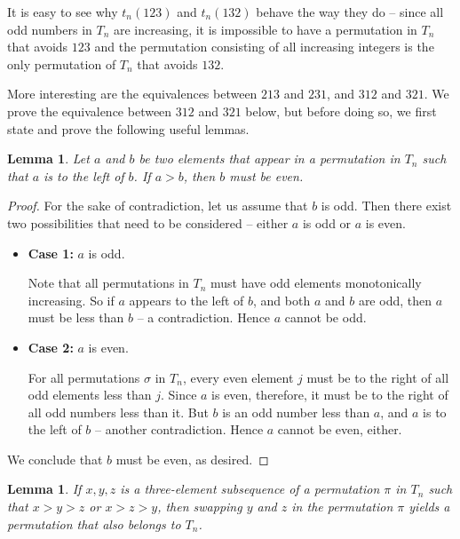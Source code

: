 \documentclass[11pt,letterpaper,twoside,english]{article}
\theoremstyle{theorem}
\newtheorem{lemma}[theorem]{Lemma}
\theoremstyle{remark}
\begin{document}
It is easy to see why $t_n(123)$ and $t_n(132)$ behave the way they do -- since all odd numbers in $T_n$ are increasing, it is impossible to have a permutation in $T_n$ that avoids $123$ and the permutation consisting of all increasing integers is the only permutation of $T_n$ that avoids $132$.

More interesting are the equivalences between $213$ and $231$, and $312$ and $321$. We  prove the equivalence between $312$ and $321$ below, but before doing so, we first state and prove the following useful lemmas.

\begin{lemma}
\label{tn_avoidance}
Let $a$ and $b$ be two elements that appear in a permutation in $T_n$ such that $a$ is to the left of $b$. If $a > b$, then $b$ must be even.
\end{lemma}

\begin{proof}
For the sake of contradiction, let us assume that $b$ is odd. Then there exist two possibilities that need to be considered -- either $a$ is odd or $a$ is even.

\begin{itemize}
\item \textbf{Case 1:} $a$ is odd.

Note that all permutations in $T_n$ must have odd elements monotonically increasing. So if $a$ appears to the left of $b$, and both $a$ and $b$ are odd, then $a$ must be less than $b$ -- a contradiction. Hence $a$ cannot be odd.

\item \textbf{Case 2:} $a$ is even.

For all permutations $\sigma$ in $T_n$, every even element $j$ must be to the right of all odd elements less than $j$. Since $a$ is even, therefore, it must be to the right of all odd numbers less than it. But $b$ is an odd number less than $a$, and $a$ is to the left of $b$ -- another contradiction. Hence $a$ cannot be even, either.
\end{itemize}

We conclude that $b$ must be even, as desired.
\end{proof}

\begin{lemma}
\label{swapping_lemma}
If $x, y, z$ is a three-element subsequence of a permutation $\pi$ in $T_n$ such that $x > y > z$ or $x > z > y$, then swapping $y$ and $z$ in the permutation $\pi$ yields a permutation that also belongs to $T_n$.
\end{lemma}
\end{document}

